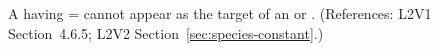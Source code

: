 A \Species having = cannot appear as the
target of an \AssignmentRule or \RateRule.  (References: L2V1
Section~4.6.5; L2V2 Section~\ref{sec:species-constant}.)

